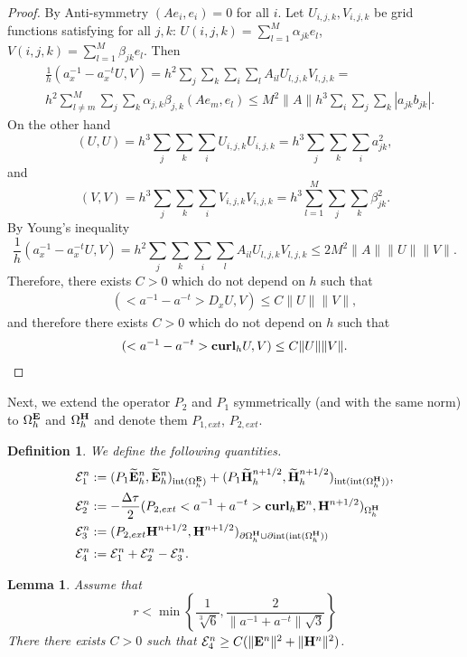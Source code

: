 \documentclass[12pt,reqno]{amsart}
\newcommand{\curl}{{\bf curl}}
\newcommand{\e}{{\bf E}}
\newcommand{\h}{{\bf H}}
\newtheorem{lem}[theorem]{Lemma}
\newtheorem{defi}[theorem]{Definition}
\theoremstyle{definition}
\numberwithin{equation}{section}
\newcommand{\intr}[1]{\mathrm{int}(#1)}
\def\Gwh{\Omega_h}
\begin{document}
\begin{proof}
By Anti-symmetry $(Ae_i,e_i)=0$ for all $i$.
  Let $U_{i,j,k}, V_{i,j,k}$ be grid functions satisfying for all $j,k$:
  $U(i,j,k)=\sum_{l=1}^M \alpha_{jk}e_l$, $V(i,j,k)=\sum_{l=1}^M \beta_{jk}e_l$.
  Then 
  \begin{align*}
  	&
 \frac{1}{h}(a_x^{-1}-a_x^{-t}U,V)=h^2 \sum_j\sum_k\sum_i\sum_l A_{il}U_{l,j,k}V_{l,j,k}=\\&
 h^2\sum_{l\neq m}^M\sum_j\sum_k\alpha_{j,k}\beta_{j,k}(Ae_m,e_l)\leq 
 M^2\|A\|h^3\sum_{i}\sum_j\sum_k |a_{jk}b_{jk}|.
  \end{align*}
On the other hand 
$$
(U,U)=h^3\sum_j\sum_k\sum_i U_{i,j,k}U_{i,j,k}=h^3\sum_j\sum_k\sum_i a_{jk}^2,
$$
and 
$$
(V,V)=h^3\sum_j\sum_k\sum_i V_{i,j,k}V_{i,j,k}=h^3\sum_{l=1}^M\sum_j\sum_k\beta_{jk}^2.
$$
By Young's inequality
  $$
   \frac{1}{h}(a_x^{-1}-a_x^{-t}U,V)= h^2 \sum_j\sum_k\sum_i\sum_l A_{il}U_{l,j,k}V_{l,j,k}\leq 
 2 M^2\|A\| \|U\|\|V\|.
  $$
Therefore, there exists $C>0$ which do not depend on $h$ such that
\begin{align}
	(<a^{-1}-a^{-t}>D_x U,V)\leq C\|U\| \|V\|,
\end{align}
and therefore 
 there exists $C>0$ which do not depend on $h$ such that
\begin{align}
	(<a^{-1}-a^{-t}>\curl_h U,V)\leq C\|U\| \|V\|.
\end{align}
% 
\end{proof}

		Next, we extend the operator $P_2$ and $P_1$ symmetrically (and with the same norm)  to $\Gwh^{\e}$ and 
$\Gwh^{\h}$ and denote them $P_{1,ext}$, $P_{2,ext}$.
\begin{defi}

	We define the following quantities.
	\begin{align*}
		&
		\mathcal{E}_1^{n}:=
		(P_1\widetilde{\e}_h^{n},\widetilde{\e}_h^{n})_{\intr{\Gwh^\e}}+
		(P_1\widetilde{\h}_h^{n+1/2},\widetilde{\h}_h^{n+1/2})_{\intr{\intr{\Gwh^\h}}}, \\&
		\mathcal{E}_2^{n}:=-\frac{\Delta \tau}{2}(P_{2,ext}<a^{-1}+a^{-t}>\curl_h \e^{n},\h^{n+1/2})_{\Gwh^\h}\\&
		\mathcal{E}_3^{n}:=(P_{2,ext}\h^{n+1/2},\h^{n+1/2})_{\partial \Gwh^\h\cup \partial \intr{\intr{\Gwh^\h}}}\\&
		\mathcal{E}_4^{n}:=\mathcal{E}^n_1+\mathcal{E}^n_2-\mathcal{E}^n_3.
	\end{align*}
\end{defi}
\begin{lem}\label{lem:first}
	Assume that 
	\begin{equation}\label{eq:cfl}
	r<\min \left \{  \frac{1}{\sqrt[3]{6}},\frac{2}{\|a^{-1}+a^{-t}\|\sqrt{3}}  \right \}
	\end{equation}
	There there exists $C>0$ such that  
	$\mathcal{E}_4^n\geq C(\|\e^n\|^2+\|\h^n\|^2) $.
\end{lem}
\end{document}
